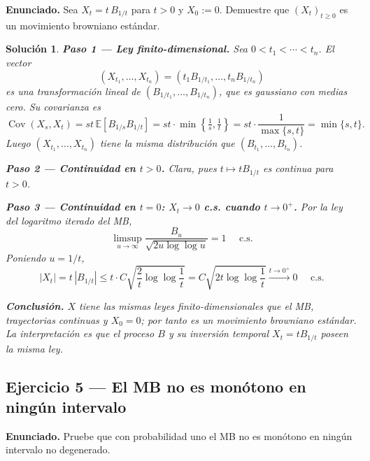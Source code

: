 \documentclass[12pt,letterpaper]{article}
\theoremstyle{ejercicio}
\theoremstyle{solucion}
\newtheorem*{solucion}{Solución}
\newcommand{\E}{\mathbb{E}}
\newcommand{\Cov}{\operatorname{Cov}}
\newcommand{\as}{\text{ c.s.}}
\begin{document}
\begin{recuadro}
\textbf{Enunciado.} Sea $X_t = t\,B_{1/t}$ para $t>0$ y $X_0:=0$. Demuestre que
$(X_t)_{t\ge 0}$ es un movimiento browniano estándar.
\end{recuadro}

\begin{solucion}

\textbf{Paso 1 — Ley finito-dimensional.}
Sea $0<t_1<\cdots<t_n$. El vector
\[
  (X_{t_1},\dots,X_{t_n}) = (t_1 B_{1/t_1},\dots,t_n B_{1/t_n})
\]
es una transformación lineal de $(B_{1/t_1},\dots,B_{1/t_n})$, que es gaussiano
con medias cero. Su covarianza es
\[
  \Cov(X_s,X_t) = st\,\E\!\left[B_{1/s}B_{1/t}\right]
  = st\cdot\min\!\left\{\tfrac{1}{s},\tfrac{1}{t}\right\}
  = st\cdot\frac{1}{\max\{s,t\}} = \min\{s,t\}.
\]
Luego $(X_{t_1},\dots,X_{t_n})$ tiene la misma distribución que $(B_{t_1},\dots,B_{t_n})$.

\textbf{Paso 2 — Continuidad en $t>0$.} Clara, pues $t\mapsto tB_{1/t}$ es continua para $t>0$.

\textbf{Paso 3 — Continuidad en $t=0$: $X_t\to 0$ c.s. cuando $t\to 0^+$.}
Por la ley del logaritmo iterado del MB,
\[
  \limsup_{u\to\infty}\frac{B_u}{\sqrt{2u\log\log u}} = 1\quad\as
\]
Poniendo $u=1/t$,
\[
  |X_t| = t\,|B_{1/t}| \le t\cdot C\sqrt{\frac{2}{t}\log\log\frac{1}{t}}
         = C\sqrt{2t\log\log\frac{1}{t}} \xrightarrow{t\to 0^+} 0\quad\as
\]

\textbf{Conclusión.} $X$ tiene las mismas leyes finito-dimensionales que el MB, trayectorias
continuas y $X_0=0$; por tanto es un movimiento browniano estándar. La interpretación es que
el proceso $B$ y su inversión temporal $X_t=tB_{1/t}$ poseen la misma ley.
\end{solucion}

\subsection*{Ejercicio 5 — El MB no es monótono en ningún intervalo}

\begin{recuadro}
\textbf{Enunciado.} Pruebe que con probabilidad uno el MB no es monótono en ningún
intervalo no degenerado.
\end{recuadro}
\end{document}
